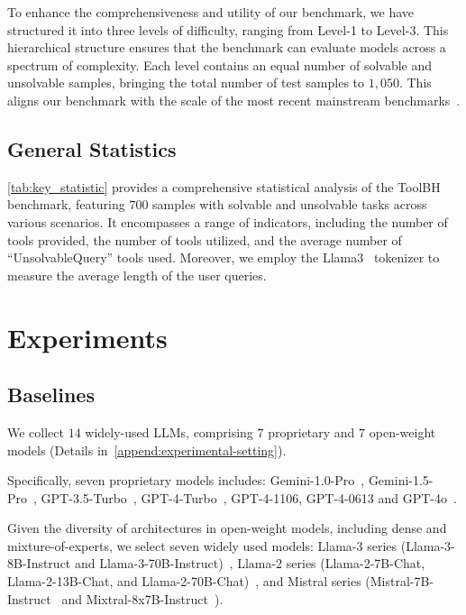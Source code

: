 \documentclass[11pt]{article}
\newcommand{\benchname}{ToolBH\xspace}
\begin{document}
To enhance the comprehensiveness and utility of our benchmark, we have structured it into three levels of difficulty, ranging from Level-1 to Level-3. 
This hierarchical structure ensures that the benchmark can evaluate models across a spectrum of complexity. 
Each level contains an equal number of solvable and unsolvable samples, bringing the total number of test samples to $1,050$.
This aligns our benchmark with the scale of the most recent mainstream benchmarks~\cite{DBLP:journals/corr/abs-2307-16789@toolbench,DBLP:journals/corr/abs-2401-13178@agentboard,DBLP:journals/corr/abs-2308-03688@agentbench}.

\subsection{General Statistics}

\cref{tab:key_statistic} provides a comprehensive statistical analysis of the \benchname benchmark, featuring $700$ samples with solvable and unsolvable tasks across various scenarios.
It encompasses a range of indicators, including the number of tools provided, the number of tools utilized, and the average number of ``UnsolvableQuery'' tools used.
Moreover, we employ the Llama3~\cite{metaAI@llama3} tokenizer to measure the average length of the user queries.

\section{Experiments}
\label{experiment}
\subsection{Baselines}

We collect $14$ widely-used LLMs, comprising $7$ proprietary and $7$ open-weight models (Details in~\cref{append:experimental-setting}).

Specifically, seven proprietary models includes: Gemini-1.0-Pro~\cite{DBLP:journals/corr/abs-2312-11805@gemini-1.0}, Gemini-1.5-Pro~\cite{DBLP:journals/corr/abs-2403-05530@gemini-1.5}, GPT-3.5-Turbo~\cite{openaichatgpt@chatgpt}, GPT-4-Turbo~\cite{DBLP:journals/corr/abs-2303-08774@gpt4}, GPT-4-1106, GPT-4-0613 and GPT-4o~\cite{openai@gpt4o}.

Given the diversity of architectures in open-weight models, 
including dense and mixture-of-experts, we select seven widely used models:
Llama-3 series (Llama-3-8B-Instruct and Llama-3-70B-Instruct)~\cite{metaAI@llama3}, 
Llama-2 series (Llama-2-7B-Chat, Llama-2-13B-Chat, and Llama-2-70B-Chat)~\cite{DBLP:journals/corr/abs-2307-09288@llama2}, and Mistral series (Mistral-7B-Instruct~\cite{mistralai@7B} and Mixtral-8x7B-Instruct~\cite{mistralai@8x7B}).
\end{document}
